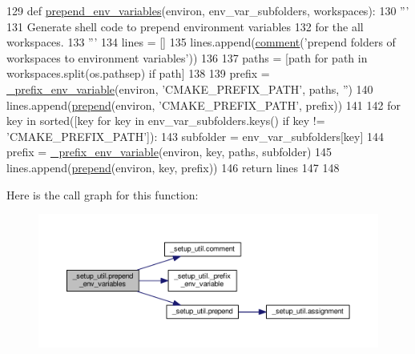 \begin{DoxyCode}
129 \textcolor{keyword}{def }\hyperlink{namespace__setup__util_a832417d18b85bd1d276a87547e86f860}{prepend\_env\_variables}(environ, env\_var\_subfolders, workspaces):
130     \textcolor{stringliteral}{'''}
131 \textcolor{stringliteral}{    Generate shell code to prepend environment variables}
132 \textcolor{stringliteral}{    for the all workspaces.}
133 \textcolor{stringliteral}{    '''}
134     lines = []
135     lines.append(\hyperlink{namespace__setup__util_abe8c95c4cfe8b1374dacd5f91d984353}{comment}(\textcolor{stringliteral}{'prepend folders of workspaces to environment variables'}))
136 
137     paths = [path \textcolor{keywordflow}{for} path \textcolor{keywordflow}{in} workspaces.split(os.pathsep) \textcolor{keywordflow}{if} path]
138 
139     prefix = \hyperlink{namespace__setup__util_a74a1f8575ed82282d03f7795c9ba6e45}{\_prefix\_env\_variable}(environ, \textcolor{stringliteral}{'CMAKE\_PREFIX\_PATH'}, paths, \textcolor{stringliteral}{''})
140     lines.append(\hyperlink{namespace__setup__util_ae78d86b2c4279f5b8b1acaa146c35802}{prepend}(environ, \textcolor{stringliteral}{'CMAKE\_PREFIX\_PATH'}, prefix))
141 
142     \textcolor{keywordflow}{for} key \textcolor{keywordflow}{in} sorted([key \textcolor{keywordflow}{for} key \textcolor{keywordflow}{in} env\_var\_subfolders.keys() \textcolor{keywordflow}{if} key != \textcolor{stringliteral}{'CMAKE\_PREFIX\_PATH'}]):
143         subfolder = env\_var\_subfolders[key]
144         prefix = \hyperlink{namespace__setup__util_a74a1f8575ed82282d03f7795c9ba6e45}{\_prefix\_env\_variable}(environ, key, paths, subfolder)
145         lines.append(\hyperlink{namespace__setup__util_ae78d86b2c4279f5b8b1acaa146c35802}{prepend}(environ, key, prefix))
146     \textcolor{keywordflow}{return} lines
147 
148 
\end{DoxyCode}


Here is the call graph for this function\+:
\nopagebreak
\begin{figure}[H]
\begin{center}
\leavevmode
\includegraphics[width=350pt]{namespace__setup__util_a832417d18b85bd1d276a87547e86f860_cgraph}
\end{center}
\end{figure}



